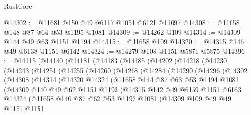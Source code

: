 \begin{lexlean}{RustCore}
\begin{coremodule}
@14302 := @11681 @150 @49 @6117 @1051 @6121 @11697
@14308 := @11658 @148 @87 @64 @53 @1195 @1081
@14309 := @14262 @109
@14314 := @14309 @144 @49 @63 @1151 @1194
@14315 := @11658 @109
@14320 := @14315 @146 @49 @6138 @1151 @6142
@14324 := @14279 @108 @1151 @5871 @5875
@14396 := @14115
    (@14140
      (@14181
        (@14183
          (@14185
            (@14202
              (@14218
                (@14230
                  (@14243
                    (@14251
                      (@14255
                        (@14260
                          (@14268
                            (@14284
                              (@14290
                                (@14296
                                  (@14302
                                    (@14308
                                      (@14314
                                        (@14320
                                          @14324
                                          (@11658
                                            @144
                                            @87
                                            @63
                                            @53
                                            @1194
                                            @1081
                                            (@14309
                                              @140
                                              @49
                                              @62
                                              @1151
                                              @1193
                                              (@14315
                                                @142
                                                @49
                                                @6159
                                                @1151
                                                @6163
                                                @14324
                                                (@11658
                                                  @140
                                                  @87
                                                  @62
                                                  @53
                                                  @1193
                                                  @1081
                                                  (@14309
                                                    @109
                                                    @49
                                                    @49
                                                    @1151
                                                    @1151

\end{coremodule}
\end{lexlean}
